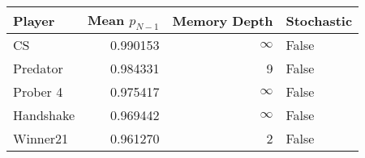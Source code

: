 \begin{tabular}{lrrl}
\toprule
    Player &  Mean $p_{N-1}$ &  Memory Depth & Stochastic \\
\midrule
        CS &        0.990153 &            \(\infty\) &      False \\
  Predator &        0.984331 &             9 &      False \\
  Prober 4 &        0.975417 &            \(\infty\) &      False \\
 Handshake &        0.969442 &            \(\infty\) &      False \\
  Winner21 &        0.961270 &             2 &      False \\
\bottomrule
\end{tabular}

